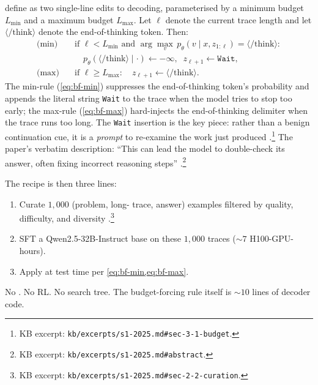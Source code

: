 \citet[\S 3.1]{s1-2025} define  as two single-line
edits to  decoding, parameterised by a minimum budget
$L_\text{min}$ and a maximum budget $L_\text{max}$. Let
$\ell$ denote the current trace length and let $\langle/\text{think}\rangle$
denote the end-of-thinking token. Then:
\begin{align}
  \text{(min)} \quad &\text{if } \ell < L_\text{min} \text{ and } \arg\max_v\, p_\theta(v \mid x, z_{1:\ell}) = \langle/\text{think}\rangle:\nonumber \\
  &\quad p_\theta(\langle/\text{think}\rangle \mid \cdot) \leftarrow -\infty,\;\; z_{\ell+1} \leftarrow \texttt{Wait}, \label{eq:bf-min} \\
  \text{(max)} \quad &\text{if } \ell \ge L_\text{max}:\quad z_{\ell+1} \leftarrow \langle/\text{think}\rangle. \label{eq:bf-max}
\end{align}
The min-rule (\cref{eq:bf-min}) suppresses the end-of-thinking token's
probability and appends the literal string \texttt{Wait} to the trace
when the model tries to stop too early; the max-rule
(\cref{eq:bf-max}) hard-injects the end-of-thinking delimiter when the
trace runs too long. The \texttt{Wait} insertion is the key
piece: rather than a benign continuation cue, it is a \emph{prompt} to
re-examine the work just produced
\citep[\S 3.1]{s1-2025}.\footnote{KB excerpt:
\nolinkurl{kb/excerpts/s1-2025.md#sec-3-1-budget}.} The paper's verbatim
description: ``This can lead the model to double-check its answer,
often fixing incorrect reasoning steps''
\citep[abstract]{s1-2025}.\footnote{KB excerpt:
\nolinkurl{kb/excerpts/s1-2025.md#abstract}.}

The recipe is then three lines:
\begin{enumerate}
  \item Curate $1{,}000$ (problem, long- trace, answer) examples
        filtered by quality, difficulty, and diversity
        \citep[\S 2.2]{s1-2025}.\footnote{KB excerpt:
        \nolinkurl{kb/excerpts/s1-2025.md#sec-2-2-curation}.}
  \item SFT a Qwen2.5-32B-Instruct base on these $1{,}000$ traces
        ($\sim 7$ H100-GPU-hours).
  \item Apply  at test time per
        \cref{eq:bf-min,eq:bf-max}.
\end{enumerate}
No . No RL. No search tree. The budget-forcing rule itself
is $\sim 10$ lines of decoder code.

